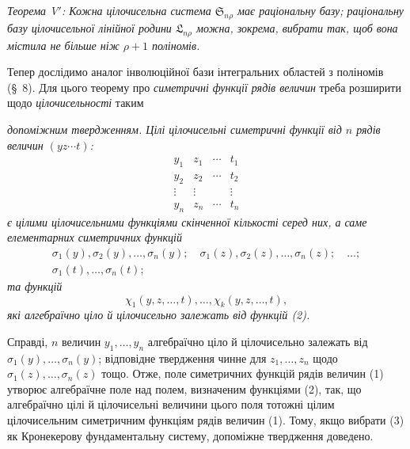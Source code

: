 \documentclass[11pt]{article}
\providecommand{\Ssys}{\mathfrak{S}}
\providecommand{\Lsys}{\mathfrak{L}}
\begin{document}
\emph{Теорема V$'$: Кожна цілочисельна система $\Ssys_{n\rho}$ має раціональну базу; раціональну базу цілочисельної лінійної родини $\Lsys_{n\rho}$ можна, зокрема, вибрати так, щоб вона містила не більше ніж $\rho+1$ поліномів.}

Тепер дослідимо аналог інволюційної бази інтегральних областей з поліномів (\S\ 8). Для цього теорему про \emph{симетричні функції рядів величин} треба розширити щодо \emph{цілочисельності} таким

\emph{допоміжним твердженням. Цілі цілочисельні симетричні функції від $n$ рядів величин $(yz\cdots t)$:}
\begin{equation}
\begin{array}{cccc}
  y_1&z_1&\cdots&t_1\\
  y_2&z_2&\cdots&t_2\\
  \vdots&\vdots&&\vdots\\
  y_n&z_n&\cdots&t_n
\end{array}
\tag{1}
\end{equation}
\emph{є цілими цілочисельними функціями скінченної кількості серед них, а саме елементарних симетричних функцій}
\begin{equation}
\begin{gathered}
  \sigma_1(y),\sigma_2(y),\ldots,\sigma_n(y);\quad
  \sigma_1(z),\sigma_2(z),\ldots,\sigma_n(z);\quad\ldots;\\
  \sigma_1(t),\ldots,\sigma_n(t);
\end{gathered}
\tag{2}
\end{equation}
\emph{та функцій}
\begin{equation}
  \chi_1(y,z,\ldots,t),\ldots,\chi_k(y,z,\ldots,t),
\tag{3}
\end{equation}
\emph{які алгебраїчно ціло й цілочисельно залежать від функцій (2).}

Справді, $n$ величин $y_1,\ldots,y_n$ алгебраїчно ціло й цілочисельно залежать від $\sigma_1(y),\ldots,\sigma_n(y)$; відповідне твердження чинне для $z_1,\ldots,z_n$ щодо $\sigma_1(z),\ldots,\sigma_n(z)$ тощо. Отже, поле симетричних функцій рядів величин (1) утворює алгебраїчне поле над полем, визначеним функціями (2), так, що алгебраїчно цілі й цілочисельні величини цього поля тотожні цілим цілочисельним симетричним функціям рядів величин (1). Тому, якщо вибрати (3) як Кронекерову фундаментальну систему, допоміжне твердження доведено.
\end{document}
